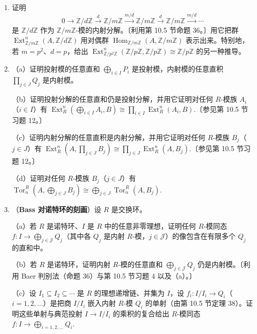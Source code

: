 \begin{enumerate}
\item 证明
\[
0 \to \mathbb{Z}/d\mathbb{Z} \xrightarrow{d} \mathbb{Z}/m\mathbb{Z} \xrightarrow{m/d} \mathbb{Z}/m\mathbb{Z} \xrightarrow{d} \mathbb{Z}/m\mathbb{Z} \xrightarrow{m/d} \cdots
\]
是 \(\mathbb{Z}/d\mathbb{Z}\) 作为 \(\mathbb{Z}/m\mathbb{Z}\)-模的内射分解。〔利用第 10.5 节命题 36。〕用它把群 \(\operatorname{Ext}_{\mathbb{Z}/m\mathbb{Z}}^n(A, \mathbb{Z}/d\mathbb{Z})\) 用对偶群 \(\operatorname{Hom}_{\mathbb{Z}/m\mathbb{Z}}(A, \mathbb{Z}/m\mathbb{Z})\) 表示出来。特别地，若 \(m = p^2\)、\(d = p\)，给出 \(\operatorname{Ext}_{\mathbb{Z}/p^2\mathbb{Z}}^n(\mathbb{Z}/p\mathbb{Z}, \mathbb{Z}/p\mathbb{Z}) \cong \mathbb{Z}/p\mathbb{Z}\) 的另一种推导。

\item （a）证明投射模的任意直和 \(\bigoplus_{i \in I}P_i\) 是投射模，内射模的任意直积 \(\prod_{j \in J}Q_j\) 是内射模。

（b）证明投射分解的任意直和仍是投射分解，并用它证明对任何 \(R\)-模族 \(A_i\)（\(i \in I\)）有 \(\operatorname{Ext}_R^n\left(\bigoplus_{i \in I}A_i, B\right) \cong \prod_{i \in I}\operatorname{Ext}_R^n(A_i, B)\).〔参见第 10.5 节习题 12。〕

（c）证明内射分解的任意直积是内射分解，并用它证明对任何 \(R\)-模族 \(B_j\)（\(j \in J\)）有 \(\operatorname{Ext}_R^n\left(A, \prod_{j \in J}B_j\right) \cong \prod_{j \in J}\operatorname{Ext}_R^n(A, B_j)\).〔参见第 10.5 节习题 12。〕

（d）证明对任何 \(R\)-模族 \(B_j\)（\(j \in J\)）有 \(\operatorname{Tor}_n^R\left(A, \bigoplus_{j \in J}B_j\right) \cong \bigoplus_{j \in J}\operatorname{Tor}_n^R(A, B_j)\).

\item （\textbf{Bass 对诺特环的刻画}）设 \(R\) 是交换环。

（a）若 \(R\) 是诺特环、\(I\) 是 \(R\) 中的任意非零理想，证明任何 \(R\)-模同态 \(f : I \to \bigoplus_{j \in \mathcal{J}}Q_j\)（其中各 \(Q_j\) 是内射 \(R\)-模，\(j \in \mathcal{J}\)）的像包含在有限多个 \(Q_j\) 的直和中。

（b）若 \(R\) 是诺特环，证明内射 \(R\)-模的任意直和 \(\bigoplus_{j \in \mathcal{J}}Q_j\) 仍是内射模。〔利用 Baer 判别法（命题 36）与第 10.5 节习题 4 以及（a）。〕

（c）设 \(I_1 \subseteq I_2 \subseteq \cdots\) 是 \(R\) 的理想递增链、并集为 \(I\)，设 \(f_i : I/I_i \to Q_i\)（\(i = 1, 2, \ldots\)）是把商 \(I/I_i\) 嵌入内射 \(R\)-模 \(Q_i\) 的单射（由第 10.5 节定理 38）。证明这些单射与典范投射 \(I \to I/I_i\) 的乘积的复合给出 \(R\)-模同态 \(f : I \to \bigoplus_{i=1,2,\ldots}Q_i\).


\end{enumerate}
